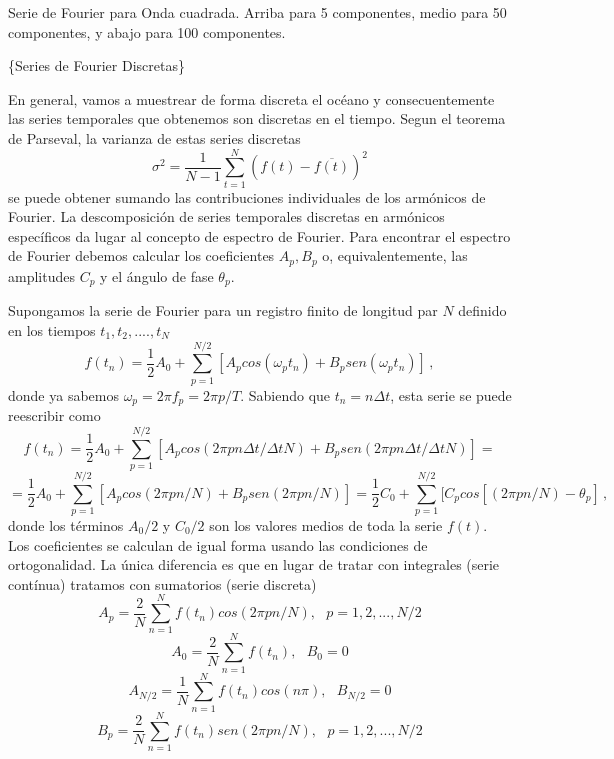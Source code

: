 \documentclass[
]{agujournal2019}
\begin{document}
\begin{center}
\end{center}

\begin{center}
Serie de Fourier para Onda cuadrada. Arriba para 5 componentes, medio para 
50 componentes, y abajo para 100 componentes.
\end{center}

\vspace{0.25cm}

\{\textbf \large Series de Fourier Discretas\}

En general, vamos a muestrear de forma discreta el océano y
consecuentemente las series temporales que obtenemos son discretas en el
tiempo. Segun el teorema de Parseval, la varianza de estas series
discretas
\[\sigma^2=\frac{1}{N-1}\sum\limits^N_{t=1}(f(t)-\overline{f(t)})^2\] se
puede obtener sumando las contribuciones individuales de los armónicos
de Fourier. La descomposición de series temporales discretas en
armónicos específicos da lugar al concepto de espectro de Fourier. Para
encontrar el espectro de Fourier debemos calcular los coeficientes
\(A_p,B_p\) o, equivalentemente, las amplitudes \(C_p\) y el ángulo de
fase \(\theta_p\).

Supongamos la serie de Fourier para un registro finito de longitud par
\(N\) definido en los tiempos \(t_1, t_2,....,t_N\)
\[f(t_n)=\frac{1}{2}A_0+\sum\limits^{N/2}_{p=1}[A_p cos(\omega_p t_n) + B_p sen(\omega_p t_n)]\,,\]
donde ya sabemos \(\omega_p=2\pi f_p=2\pi p/T\). Sabiendo que
\(t_n=n \Delta t\), esta serie se puede reescribir como
\[f(t_n)=\frac{1}{2}A_0+\sum\limits^{N/2}_{p=1}[A_p cos(2\pi p n \Delta t / \Delta t N) + B_p sen(2\pi p n \Delta t / \Delta t N)]=\]
\[=\frac{1}{2}A_0+\sum\limits^{N/2}_{p=1}[A_p cos(2\pi p n  / N) + B_p sen(2\pi p n / N)]=
\frac{1}{2}C_0 + \sum\limits^{N/2}_{p=1}[C_p cos[(2\pi p n  / N) - \theta_p]\,,\]
donde los términos \(A_0/2\) y \(C_0/2\) son los valores medios de toda
la serie \(f(t)\). Los coeficientes se calculan de igual forma usando
las condiciones de ortogonalidad. La única diferencia es que en lugar de
tratar con integrales (serie contínua) tratamos con sumatorios (serie
discreta)
\[A_p=\frac{2}{N}\sum\limits_{n=1}^{N} f(t_n) cos(2\pi p n /N),\,\,\,\,p=1,2,...,N/2\]
\[A_0=\frac{2}{N}\sum\limits_{n=1}^{N} f(t_n),\,\,\,\,B_0=0\]
\[A_{N/2}=\frac{1}{N}\sum\limits_{n=1}^{N} f(t_n)cos(n\pi),\,\,\,\,B_{N/2}=0\]
\[B_p=\frac{2}{N}\sum\limits_{n=1}^{N} f(t_n) sen(2\pi p n /N),\,\,\,\,p=1,2,...,N/2\]
\end{document}
